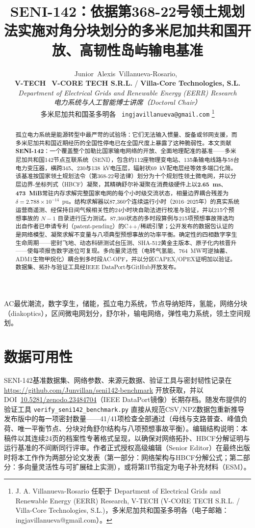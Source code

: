 \documentclass[11pt, journal, onecolumn]{IEEEtran}
\title{SENI-142：依据第368-22号领土规划法实施对角分块划分的多米尼加共和国开放、高韧性岛屿输电基准}
\author{Junior~Alexis~Villanueva-Rosario,~\IEEEmembership{Ms.C., Ph.D.(c)}\\[0.3em]
{\normalsize\textnormal{\textbf{V-TECH} \textbar\ \textbf{V-CORE TECH S.R.L.} / \textbf{Villa-Core Technologies, S.L.}}}\\[0.15em]
{\footnotesize\textnormal{\textit{Department of Electrical Grids and Renewable Energy (EERR) Research}}}\\[0.15em]
{\footnotesize\textnormal{\textit{电力系统与人工智能博士讲席（Doctoral Chair）}}}\\[0.15em]
{\footnotesize\textnormal{多米尼加共和国圣多明各 \textbar\ \texttt{ingjavillanueva@gmail.com}}}%
\thanks{J. A. Villanueva-Rosario 任职于 Department of Electrical Grids and Renewable Energy (EERR) Research, V-TECH (V-CORE TECH S.R.L. / Villa-Core Technologies, S.L.)，多米尼加共和国圣多明各（电子邮箱：ingjavillanueva@gmail.com）。}}
\begin{document}
\maketitle

\begin{abstract}
孤立电力系统是能源转型中最严苛的试验场：它们无法输入惯量、旋备或邻网支援，而多米尼加共和国近期经历的全国性停电已在全国尺度上暴露了这种脆弱性。本文贡献\textbf{SENI-142}：一个覆盖整个加勒比国家输电网络的开放、全面地理配准的基准——多米尼加共和国142节点互联系统（SENI），包含约112座物理变电站、135条输电线路与58台电力变压器，横跨345、230与138~kV电压层，辐射状69~kV配电层经等效多端口化简。该基准按国家领土规划法令（第368-22号法律）划分为十个规划性领土微电网，并以分层边界-坐标列式（HBCF）凝聚，其精确舒尔补凝聚在消费级硬件上以\textbf{2.65~ms}、\textbf{473~MiB}常驻内存求解完整国家电网的每个小时级交流状态，相量边界耦合残差为 $\delta = 2.788 \times 10^{-14}$~pu。结构求解器以87,360个连续运行小时（2016--2025年）的真实系统运营商遥测、经保持日间气候相关性的24小时块自助法进行校准与验证，并以215个预想事故的 $N-1$ 目录进行压力测试。87,360状态的多时段算例与215项预想事故筛选均出自作者已申请专利（patent-pending）的C++/稀疏引擎；公开发布的数据包认证的是网络模型、凝聚求解不变量与八项典型预想事故的功率平衡。确定性的四相数字孪生生命周期——密封飞地、动态科研测试台压测、SHA-512黄金主版本、原子化内核晋升——使每项报告数字逐位可复现。多向量灵活性（电转气氢能、764~MW可逆抽蓄、ADM1生物甲烷化）耦合到多时段AC-OPF，并以分区CAPEX/OPEX证明加以验证。数据集、拓扑与验证工具经IEEE DataPort与GitHub开放发布。
\end{abstract}

\begin{IEEEkeywords}
AC最优潮流，数字孪生，储能，孤立电力系统，节点导纳矩阵，氢能，网络分块（diakoptics），区间微电网划分，舒尔补，输电网络，弹性电力系统，领土空间规划。
\end{IEEEkeywords}









\section*{数据可用性}
SENI-142基准数据集、网络参数、来源元数据、验证工具与密封韧性记录在 \url{https://github.com/Junvillan/seni142-benchmark} 开放获取，并以DOI~\href{https://doi.org/10.5281/zenodo.23484704}{10.5281/zenodo.23484704}（IEEE DataPort镜像）长期存档。随发布提供的验证工具 \texttt{verify\_seni142\_benchmark.py} 直接从规范CSV/NPZ数据包重新推导发布版中的每一项密封数量——41/41项检查全部通过（母线与支路普查、峰值负荷、唯一平衡节点、分块对角舒尔结构与八项预想事故平衡）。编辑结构说明：本稿件以其连续24页的档案性专著格式呈现，以确保对网络拓扑、HBCF分解证明与运行基准的不间断同行评审。作者正式授权高级编辑（Senior Editor）在最终出版时将本工作作为两部分论文发表（第一部分：网络架构与HBCF分解公式；第二部分：多向量灵活性与可扩展硅上实测），或将第II节指定为电子补充材料（ESM）。
\end{document}
